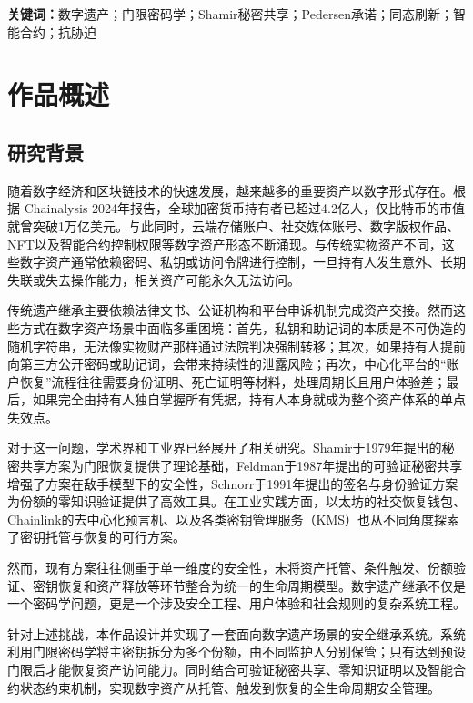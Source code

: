 \documentclass[UTF8,a4paper,zihao=-4,openany]{ctexrep}
\begin{document}
\textbf{关键词：}数字遗产；门限密码学；Shamir秘密共享；Pedersen承诺；同态刷新；智能合约；抗胁迫

\tableofcontents

\chapter{作品概述}

\section{研究背景}

随着数字经济和区块链技术的快速发展，越来越多的重要资产以数字形式存在。根据 Chainalysis 2024年报告，全球加密货币持有者已超过4.2亿人，仅比特币的市值就曾突破1万亿美元。与此同时，云端存储账户、社交媒体账号、数字版权作品、NFT以及智能合约控制权限等数字资产形态不断涌现。与传统实物资产不同，这些数字资产通常依赖密码、私钥或访问令牌进行控制，一旦持有人发生意外、长期失联或失去操作能力，相关资产可能永久无法访问。

传统遗产继承主要依赖法律文书、公证机构和平台申诉机制完成资产交接。然而这些方式在数字资产场景中面临多重困境：首先，私钥和助记词的本质是不可伪造的随机字符串，无法像实物财产那样通过法院判决强制转移；其次，如果持有人提前向第三方公开密码或助记词，会带来持续性的泄露风险；再次，中心化平台的“账户恢复”流程往往需要身份证明、死亡证明等材料，处理周期长且用户体验差；最后，如果完全由持有人独自掌握所有凭据，持有人本身就成为整个资产体系的单点失效点。

对于这一问题，学术界和工业界已经展开了相关研究。Shamir于1979年提出的秘密共享方案为门限恢复提供了理论基础，Feldman于1987年提出的可验证秘密共享增强了方案在敌手模型下的安全性，Schnorr于1991年提出的签名与身份验证方案为份额的零知识验证提供了高效工具。在工业实践方面，以太坊的社交恢复钱包、Chainlink的去中心化预言机、以及各类密钥管理服务（KMS）也从不同角度探索了密钥托管与恢复的可行方案。

然而，现有方案往往侧重于单一维度的安全性，未将资产托管、条件触发、份额验证、密钥恢复和资产释放等环节整合为统一的生命周期模型。数字遗产继承不仅是一个密码学问题，更是一个涉及安全工程、用户体验和社会规则的复杂系统工程。

针对上述挑战，本作品设计并实现了一套面向数字遗产场景的安全继承系统。系统利用门限密码学将主密钥拆分为多个份额，由不同监护人分别保管；只有达到预设门限后才能恢复资产访问能力。同时结合可验证秘密共享、零知识证明以及智能合约状态约束机制，实现数字资产从托管、触发到恢复的全生命周期安全管理。
\end{document}
